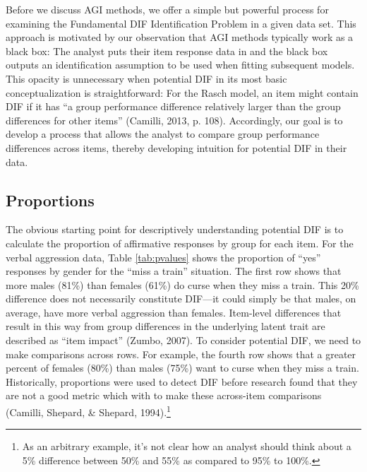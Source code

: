 \documentclass[
  english,
  man,floatsintext]{apa6}
\begin{document}
Before we discuss AGI methods, we offer a simple but powerful process for examining the Fundamental DIF Identification Problem in a given data set. This approach is motivated by our observation that AGI methods typically work as a black box: The analyst puts their item response data in and the black box outputs an identification assumption to be used when fitting subsequent models. This opacity is unnecessary when potential DIF in its most basic conceptualization is straightforward: For the Rasch model, an item might contain DIF if it has ``a group performance difference relatively larger than the group differences for other items'' (Camilli, 2013, p. 108). Accordingly, our goal is to develop a process that allows the analyst to compare group performance differences across items, thereby developing intuition for potential DIF in their data.

\hypertarget{proportions}{%
\subsection{Proportions}\label{proportions}}

The obvious starting point for descriptively understanding potential DIF is to calculate the proportion of affirmative responses by group for each item. For the verbal aggression data, Table \ref{tab:pvalues} shows the proportion of ``yes'' responses by gender for the ``miss a train'' situation. The first row shows that more males (81\%) than females (61\%) do curse when they miss a train. This 20\% difference does not necessarily constitute DIF---it could simply be that males, on average, have more verbal aggression than females. Item-level differences that result in this way from group differences in the underlying latent trait are described as ``item impact'' (Zumbo, 2007). To consider potential DIF, we need to make comparisons across rows. For example, the fourth row shows that a greater percent of females (80\%) than males (75\%) want to curse when they miss a train. Historically, proportions were used to detect DIF before research found that they are not a good metric which with to make these across-item comparisons (Camilli, Shepard, \& Shepard, 1994).\footnote{As an arbitrary example, it's not clear how an analyst should think about a 5\% difference between 50\% and 55\% as compared to 95\% to 100\%.}
\end{document}
